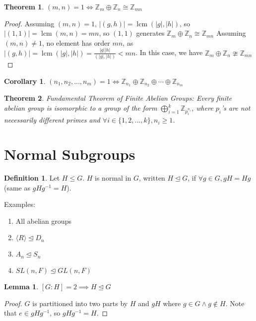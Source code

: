 \documentclass{article}
\theoremstyle{definition}
\newtheorem{definition}{Definition}
\theoremstyle{plain}
\newtheorem{theorem}{Theorem}
\theoremstyle{corollary}
\newtheorem{corollary}{Corollary}
\theoremstyle{lemma}
\newtheorem{lemma}{Lemma}
\DeclareMathOperator{\lcm}{lcm}
\begin{document}
\begin{theorem}
$(m,n)=1\iff\mathbb{Z}_m\oplus\mathbb{Z}_n\cong\mathbb{Z}_{mn}$
\end{theorem}

\begin{proof}
    Assuming $(m,n)=1$, $|(g,h)|=\lcm(|g|,|h|)$, so $|(1,1)|=\lcm(m,n)=mn$, so $(1,1)$ generates $\mathbb{Z}_m\oplus\mathbb{Z}_n\cong\mathbb{Z}_{mn}$
    Assuming $(m,n)\neq1$, no element has order $mn$, as $|(g,h)|=\lcm(|g|,|h|)=\frac{|g||h|}{(|g|,|h|)}<mn$. In this case, we  have $\mathbb{Z}_m\oplus\mathbb{Z}_n\ncong\mathbb{Z}_{mn}$
\end{proof}

\begin{corollary}
$(n_1,n_2,...,n_m)=1\iff\mathbb{Z}_{n_1}\oplus\mathbb{Z}_{n_2}\oplus\cdots\oplus\mathbb{Z}_{n_m}$
\end{corollary}
\begin{theorem}
Fundamental Theorem of Finite Abelian Groups: Every finite abelian group is isomorphic to a group of the form $\bigoplus_{i=1}^k\mathbb{Z}_{p_i^{n_i}}$, where $p_i$'s are not necessarily different primes and $\forall i\in \{1,2,...,k\},n_i\geq1$.
\end{theorem}

\section{Normal Subgroups}
\begin{definition}
Let $H\leq G$. $H$ is normal in $G$, written $H\unlhd G$, if $\forall g\in G, gH=Hg$ (same as $gHg^{-1}=H$).
\end{definition}

Examples:
\begin{enumerate}
    \item All abelian groups
    \item $\langle R\rangle\unlhd D_n$
    \item $A_n\unlhd S_n$
    \item $SL(n,F)\unlhd GL(n,F)$
\end{enumerate}

\begin{lemma}
$[G:H]=2\implies H\unlhd G$
\end{lemma}

\begin{proof}
    $G$ is partitioned into two parts by $H$ and $gH$ where $g\in G\land g\notin H$. Note that $e\in gHg^{-1}$, so $gHg^{-1}=H$.
\end{proof}
\end{document}
